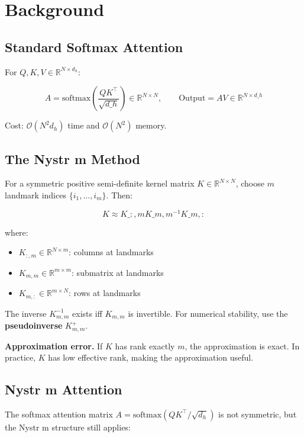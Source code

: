 
\section{Background}

\subsection{Standard Softmax Attention}

For $Q, K, V \in \mathbb{R}^{N \times d_h}$:

\[
A = \mathrm{softmax}\!\left(\frac{Q K^\top}{\sqrt{d\_h}}\right) \in \mathbb{R}^{N \times N}, \qquad
\text{Output} = A V \in \mathbb{R}^{N \times d\_h}
\tag{3.1}
\]

Cost: $\mathcal{O}(N^2 d_h)$ time and $\mathcal{O}(N^2)$ memory.

\subsection{The Nystr m Method}

For a symmetric positive semi-definite kernel matrix $K \in \mathbb{R}^{N \times N}$, 
choose $m$ landmark indices $\{i_1, \dots, i_m\}$. Then:

\[
K \approx K\_{:, m} K\_{m, m}^{-1} K\_{m, :}
\tag{3.2}
\]

where:

\begin{itemize}
\item $K_{:, m} \in \mathbb{R}^{N \times m}$: columns at landmarks
\item $K_{m, m} \in \mathbb{R}^{m \times m}$: submatrix at landmarks
\item $K_{m, :} \in \mathbb{R}^{m \times N}$: rows at landmarks

\end{itemize}
The inverse $K_{m, m}^{-1}$ exists iff $K_{m, m}$ is invertible. For 
numerical stability, use the \textbf{pseudoinverse} $K_{m, m}^+$.

\textbf{Approximation error.} If $K$ has rank exactly $m$, the approximation is 
exact. In practice, $K$ has low effective rank, making the approximation 
useful.

\subsection{Nystr m Attention}

The softmax attention matrix $A = \mathrm{softmax}(Q K^\top / \sqrt{d_h})$ 
is not symmetric, but the Nystr m structure still applies:

